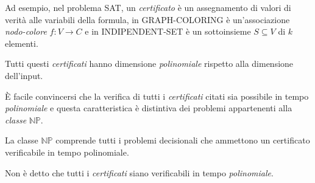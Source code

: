 \noindent
Ad esempio, nel problema SAT, un \emph{certificato} è un assegnamento di
valori di verità alle variabili della formula, in GRAPH-COLORING è un'associazione
\emph{nodo-colore} $f:V\to C$ e in INDIPENDENT-SET è un sottoinsieme $S\subseteq V$
di $k$ elementi.
\begin{note}
    Tutti questi \emph{certificati} hanno dimensione \emph{polinomiale}
    rispetto alla dimensione dell'input.
\end{note}

\noindent
È facile convincersi che la verifica di tutti i \emph{certificati} citati sia
possibile in tempo \emph{polinomiale} e questa caratteristica è distintiva dei
problemi appartenenti alla \emph{classe} $\mathbb{NP}$.

\begin{definition}
    La classe $\mathbb{NP}$ comprende tutti i problemi decisionali che ammettono
    un certificato verificabile in tempo polinomiale.
\end{definition}
\begin{note}
    Non è detto che tutti i \emph{certificati} siano verificabili in tempo
    \emph{polinomiale}.
\end{note}